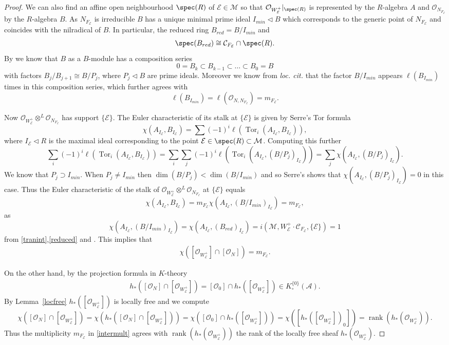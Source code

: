 \documentclass[12pt]{article}
\numberwithin{equation}{section}
\theoremstyle{remark}
\theoremstyle{definition}
\numberwithin{theorem}{section}
\def\beq{\begin{eqnarray}}
\def\eeq{\end{eqnarray}}
\def\calE{{\mathcal E}}
\DeclareMathOperator{\Tor}{Tor}
\DeclareMathOperator{\rank}{rank}
\def\M{{\mathcal{M}}}
\def\calA{{\mathcal{A}}}
\def\calC{{\mathcal C}}
\def\calO{{\mathcal O}}
\renewcommand{\1}{\mathbbm{1}}
\begin{document}
\begin{proof}
	We can also find an affine open neighbourhood $\spec(R)$  of $\calE\in \M$ so that $\calO_{W^+_\calE}|_{\spec(R)}$ is represented by the $R$-algebra $A$ and $\calO_{N_{F_\calE}}$ by the $R$-algebra $B$. As ${N_{F_\calE}}$ is irreducible $B$ has a unique minimal prime ideal $I_{min}\lhd B$ which corresponds to the generic point of ${N_{F_\calE}}$ and coincides with the nilradical of $B$. In particular, the reduced ring $B_{red}=B/I_{min}$ and \beq\label{reduced}\spec (B_{red}) \cong \calC_{F_{\calE}}\cap{\spec(R)}.\eeq  By \cite[Theorem 2 of IV.1.4]{bourbaki} %
	we know that $B$ as a $B$-module has a composition series $$0=B_k\subset B_{k-1} \subset \dots\subset B_0=B$$ with factors $B_j/{B_{j+1}}\cong B/P_j$, where $P_j\lhd B$ are prime ideals. Moreover we know from  {\em loc. cit.} that the factor $B/I_{min}$ appears $\ell(B_{I_{min}})$ times in this composition series, which further agrees with $$\ell(B_{I_{min}})=\ell(\calO_{N,N_{{F_\calE}}})=m_{F_\calE}.$$ 
	
	Now $\calO_{W^+_\calE}\otimes^L \calO_{N_{F_\calE}}$ has support $\{\calE\}$. The Euler characteristic of its stalk at $\{\calE\}$ is given by Serre's Tor formula
	$$\chi(A_{I_\calE},B_{I_\calE})=\sum (-1)^i \ell(\Tor_i(A_{I_\calE},B_{I_\calE})),$$
	where $I_\calE\lhd R$ is the maximal ideal corresponding to the point $\calE\in \spec(R)\subset \M$. Computing this further
	$$\sum_i (-1)^i \ell(\Tor_i(A_{I_\calE},B_{I_\calE}))=\sum_i \sum_j (-1)^i \ell(\Tor_i(A_{I_\calE},(B/P_j)_{I_\calE}))=\sum_j \chi(A_{I_\calE},(B/P_j)_{I_\calE}).$$
	We know that $P_j\supset I_{min}$. When $P_j\neq I_{min}$ then $\dim(B/P_j)<\dim(B/I_{min})$ and so Serre's \cite[Theorem C.1.1.a]{serre} shows that $\chi(A_{I_\calE},(B/P_j)_{I_\calE})=0$ in this case. Thus  the Euler characteristic of the stalk of $\calO_{W^+_\calE}\otimes^L \calO_{N_{F_\calE}}$ at $\{\calE\}$ equals $$\chi(A_{I_\calE},B_{I_\calE})=m_{F_\calE} \chi(A_{I_\calE},(B/I_{min})_{I_\calE})=m_{F_\calE},$$
	as $$\chi(A_{I_\calE},(B/I_{min})_{I_\calE})=\chi(A_{I_\calE},(B_{red})_{I_\calE})=i(\M,W^+_\calE\cdot \calC_{F_\calE},\{\calE\})=1$$ from \eqref{tranint},\eqref{reduced} and \cite[Theorem C.1.1.b]{serre}. This  implies  that \beq \label{intermult}\chi([\calO_{W^+_\calE}]\cap [\calO_{N}])=m_{F_\calE}.\eeq
	
	
	
	
	
	
	On the other hand, by the projection formula in $K$-theory \cite[(1)]{piepmeyer-walker} \beq\label{projection}h_*([\calO_{N}] \cap [\calO_{W^+_\calE}])=[\calO_0] \cap h_*([\calO_{W^+_\calE}]) \in K^{\{0\}}_\circ(\calA).\eeq
	By Lemma~\ref{locfree} $h_*([\calO_{W^+_\calE}])$ is locally free and we  compute $$\chi([\calO_{N}]\cap [\calO_{W^+_\calE}])=\chi(h_*([\calO_{N}]\cap [\calO_{W^+_\calE}]))=\chi([\calO_0]\cap h_*([\calO_{W^+_\calE}]))=\chi([h_*([\calO_{W^+_\calE}])_0])=\rank(h_*(\calO_{W^+_\calE})).$$
	Thus the multiplicity $m_{F_\calE}$ in \eqref{intermult} agrees with $\rank(h_*(\calO_{W^+_\calE}))$ the rank of the locally free sheaf $h_*(\calO_{W^+_\calE})$. 
	

\end{proof}
\end{document}
